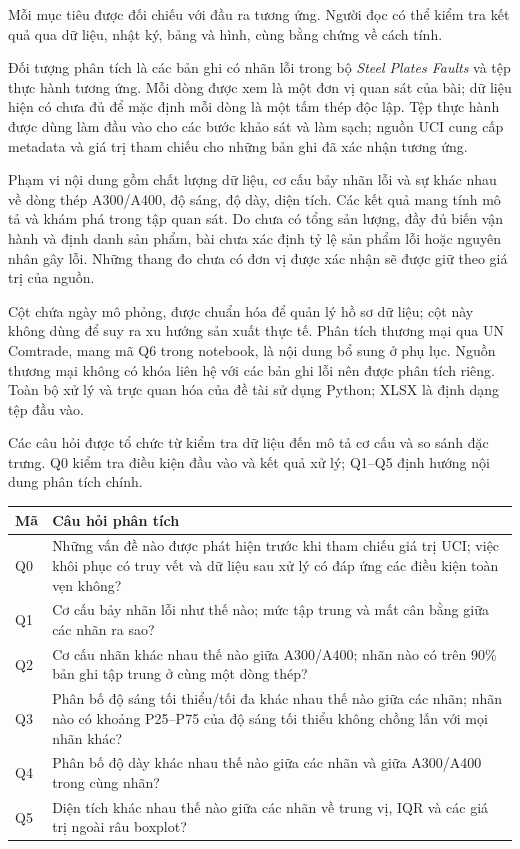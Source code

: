 Mỗi mục tiêu được đối chiếu với đầu ra tương ứng. Người đọc có thể kiểm tra kết quả qua dữ liệu, nhật ký, bảng và hình, cùng bằng chứng về cách tính.


Đối tượng phân tích là các bản ghi có nhãn lỗi trong bộ \textit{Steel Plates Faults} và tệp thực hành tương ứng. Mỗi dòng được xem là một đơn vị quan sát của bài; dữ liệu hiện có chưa đủ để mặc định mỗi dòng là một tấm thép độc lập. Tệp thực hành được dùng làm đầu vào cho các bước khảo sát và làm sạch; nguồn UCI cung cấp metadata và giá trị tham chiếu cho những bản ghi đã xác nhận tương ứng.

Phạm vi nội dung gồm chất lượng dữ liệu, cơ cấu bảy nhãn lỗi và sự khác nhau về dòng thép A300/A400, độ sáng, độ dày, diện tích. Các kết quả mang tính mô tả và khám phá trong tập quan sát. Do chưa có tổng sản lượng, đầy đủ biến vận hành và định danh sản phẩm, bài chưa xác định tỷ lệ sản phẩm lỗi hoặc nguyên nhân gây lỗi. Những thang đo chưa có đơn vị được xác nhận sẽ được giữ theo giá trị của nguồn.

Cột  chứa ngày mô phỏng, được chuẩn hóa để quản lý hồ sơ dữ liệu; cột này không dùng để suy ra xu hướng sản xuất thực tế. Phân tích thương mại qua UN Comtrade, mang mã Q6 trong notebook, là nội dung bổ sung ở phụ lục. Nguồn thương mại không có khóa liên hệ với các bản ghi lỗi nên được phân tích riêng. Toàn bộ xử lý và trực quan hóa của đề tài sử dụng Python; XLSX là định dạng tệp đầu vào.


Các câu hỏi được tổ chức từ kiểm tra dữ liệu đến mô tả cơ cấu và so sánh đặc trưng. Q0 kiểm tra điều kiện đầu vào và kết quả xử lý; Q1--Q5 định hướng nội dung phân tích chính.

\begin{center}
\small
\begin{tabularx}{\linewidth}{@{}p{0.75cm}Y@{}}
\toprule
\textbf{Mã} & \textbf{Câu hỏi phân tích} \\
\midrule
Q0 & Những vấn đề nào được phát hiện trước khi tham chiếu giá trị UCI; việc khôi phục có truy vết và dữ liệu sau xử lý có đáp ứng các điều kiện toàn vẹn không? \\
Q1 & Cơ cấu bảy nhãn lỗi như thế nào; mức tập trung và mất cân bằng giữa các nhãn ra sao? \\
Q2 & Cơ cấu nhãn khác nhau thế nào giữa A300/A400; nhãn nào có trên 90\% bản ghi tập trung ở cùng một dòng thép? \\
Q3 & Phân bố độ sáng tối thiểu/tối đa khác nhau thế nào giữa các nhãn; nhãn nào có khoảng P25--P75 của độ sáng tối thiểu không chồng lấn với mọi nhãn khác? \\
Q4 & Phân bố độ dày khác nhau thế nào giữa các nhãn và giữa A300/A400 trong cùng nhãn? \\
Q5 & Diện tích  khác nhau thế nào giữa các nhãn về trung vị, IQR và các giá trị ngoài râu boxplot? \\
\bottomrule
\end{tabularx}
\end{center}

